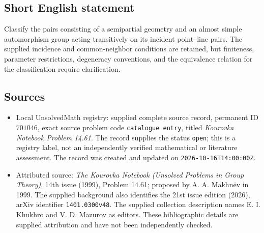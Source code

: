 \documentclass[11pt]{article}
\begin{document}
\subsection{Short English statement}
Classify the pairs consisting of a semipartial geometry and an almost simple automorphism group acting transitively on its incident point--line pairs. The supplied incidence and common-neighbor conditions are retained, but finiteness, parameter restrictions, degeneracy conventions, and the equivalence relation for the classification require clarification.
\subsection{Sources}
\begin{itemize}
\item Local UnsolvedMath registry: supplied complete source record, permanent ID \(701046\), exact source problem code \texttt{catalogue entry}, titled \emph{Kourovka Notebook Problem 14.61}. The record supplies the status \texttt{open}; this is a registry label, not an independently verified mathematical or literature assessment. The record was created and updated on \texttt{2026-10-16T14:00:00Z}.
\item Attributed source: \emph{The Kourovka Notebook (Unsolved Problems in Group Theory)}, 14th issue (1999), Problem 14.61; proposed by A. A. Makhn\"{e}v in 1999. The supplied background also identifies the 21st issue edition (2026), arXiv identifier \texttt{1401.0300v48}. The supplied collection description names E. I. Khukhro and V. D. Mazurov as editors. These bibliographic details are supplied attribution and have not been independently checked.
\end{itemize}
\end{document}
